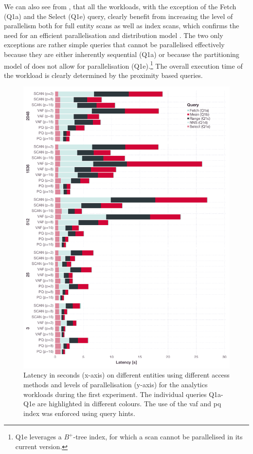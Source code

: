 We can also see from , that all the workloads, with the exception of the Fetch (Q1a) and the Select (Q1e) query, clearly benefit from increasing the level of parallelism both for full entity scans as well as index scans, which confirms the need for an efficient parallelisation and distribution model \cite{Giangreco:2018Database}. The two only exceptions are rather simple queries that cannot be parallelised effectively because they are either inherently sequential (Q1a) or because the partitioning model of \cottontail{} does not allow for parallelisation (Q1e).\footnote{Q1e leverages a $B^+$-tree index, for which a scan cannot be parallelised in its current version.} The overall execution time of the workload is clearly determined by the proximity based queries.

\begin{figure}[p]
    \centering
    \includegraphics[width=\textwidth]{figures/analytics/analytics-cottontail-runtime}
    \caption {Latency in seconds (x-axis) on different entities using different access methods and levels of parallelisation (y-axis) for the analytics workloads during the first experiment. The individual queries Q1a-Q1e are highlighted in different colours. The use of the \acrshort{vaf} and \acrshort{pq} index was enforced using query hints.}
    \label{figure:analytics_cottontail_runtime}
\end{figure}

